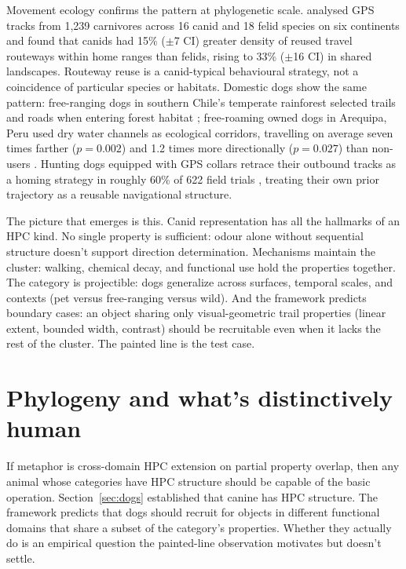 \documentclass[12pt]{article}
\begin{document}
Movement ecology confirms the pattern at phylogenetic scale. \textcite{fagan2025} analysed GPS tracks from 1,239 carnivores across 16 canid and 18 felid species on six continents and found that canids had 15\% ($\pm$7 CI) greater density of reused travel routeways within home ranges than felids, rising to 33\% ($\pm$16 CI) in shared landscapes. Routeway reuse is a canid-typical behavioural strategy, not a coincidence of particular species or habitats. Domestic dogs show the same pattern: free-ranging dogs in southern Chile's temperate rainforest selected trails and roads when entering forest habitat \citep{sepulveda2015}; free-roaming owned dogs in Arequipa, Peru used dry water channels as ecological corridors, travelling on average seven times farther ($p = 0.002$) and 1.2 times more directionally ($p = 0.027$) than non-users \citep{raynor2020}. Hunting dogs equipped with GPS collars retrace their outbound tracks as a homing strategy in roughly 60\% of 622 field trials \citep{benediktova2020}, treating their own prior trajectory as a reusable navigational structure.

The picture that emerges is this. Canid  representation has all the hallmarks of an HPC kind. No single property is sufficient: odour alone without sequential structure doesn't support direction determination. Mechanisms maintain the cluster: walking, chemical decay, and functional use hold the properties together. The category is projectible: dogs generalize across surfaces, temporal scales, and contexts (pet versus free-ranging versus wild). And the framework predicts boundary cases: an object sharing only visual-geometric trail properties (linear extent, bounded width, contrast) should be recruitable even when it lacks the rest of the cluster. The painted line is the test case.

\section{Phylogeny and what's distinctively human}
\label{sec:phylogeny}

If metaphor is cross-domain HPC extension on partial property overlap, then any animal whose categories have HPC structure should be capable of the basic operation. Section~\ref{sec:dogs} established that canine  has HPC structure. The framework predicts that dogs should recruit  for objects in different functional domains that share a subset of the category's properties. Whether they actually do is an empirical question the painted-line observation motivates but doesn't settle.
\end{document}

